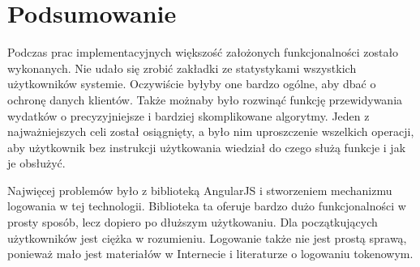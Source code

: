 \documentclass[10pt,titlepage]{article}
\begin{document}
\section*{Podsumowanie}
Podczas prac implementacyjnych większość założonych funkcjonalności zostało wykonanych. Nie udało się zrobić zakładki ze statystykami wszystkich użytkowników systemie. Oczywiście byłyby one bardzo ogólne, aby dbać o ochronę danych klientów. Także możnaby było rozwinąć funkcję przewidywania wydatków o precyzyjniejsze i bardziej skomplikowane algorytmy. Jeden z najważniejszych celi został osiągnięty, a było nim uproszczenie wszelkich operacji, aby użytkownik bez instrukcji użytkowania wiedział do czego służą funkcje i jak je obsłużyć.
\par Najwięcej problemów było z biblioteką AngularJS i stworzeniem mechanizmu logowania w tej technologii. Biblioteka ta oferuje bardzo dużo funkcjonalności w prosty sposób, lecz dopiero po dłuższym użytkowaniu. Dla początkujących użytkowników jest ciężka w rozumieniu. Logowanie także nie jest prostą sprawą, ponieważ mało jest materiałów w Internecie i literaturze o logowaniu tokenowym.





\end{document}
